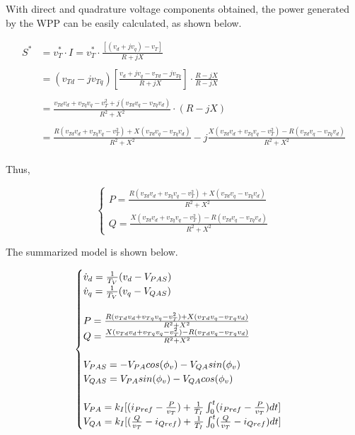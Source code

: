 With direct and quadrature voltage components obtained, the power generated by the WPP can be easily calculated, as shown below.

\begin{align*}
		S^{*} &= v_{T}^{*} \cdot I = v_{T}^{*} \cdot \frac{[(v_{d} + jv_{q}) - v_{T}]}{R + jX} \\
		\\
		&= (v_{Td} - jv_{Tq})\left[\frac{v_{d} + jv_{q} - v_{Td} - jv_{Tq}}{R + jX}\right]\cdot \frac{R - jX}{R - jX} \\
		\\
		&= \frac{v_{Td}v_{d} + v_{Tq}v_{q} - v_{T}^{2} + j(v_{Td}v_{q} - v_{Tq}v_{d})}{R^{2} + X^{2}}\cdot (R - jX) \\
		\\
		&= \frac{R(v_{Td}v_{d} + v_{Tq}v_{q} - v_{T}^{2}) + X(v_{Td}v_{q} - v_{Tq}v_{d})}{R^{2} + X^{2}} - j\frac{X(v_{Td}v_{d} + v_{Tq}v_{q} - v_{T}^{2}) - R(v_{Td}v_{q} - v_{Tq}v_{d})}{R^{2} + X^{2}} \\
\end{align*}

Thus,

\begin{equation}
	\begin{cases}
		P = \frac{R(v_{Td}v_{d} + v_{Tq}v_{q} - v_{T}^{2}) + X(v_{Td}v_{q} - v_{Tq}v_{d})}{R^{2} + X^{2}} \\
		Q = \frac{X(v_{Td}v_{d} + v_{Tq}v_{q} - v_{T}^{2}) - R(v_{Td}v_{q} - v_{Tq}v_{d})}{R^{2} + X^{2}}
	\end{cases}
	\label{eq: Outputs}
\end{equation}

The summarized model is shown below.

\begin{equation}
	\begin{cases}
		\dot{v}_{d} = \frac{1}{T_{V}}(v_{d} - V_{PAS}) \\
		\dot{v}_{q} = \frac{1}{T_{V}}(v_{q} - V_{QAS}) \\
		\\
		P = \frac{R(v_{Td}v_{d} + v_{Tq}v_{q} - v_{T}^{2}) + X(v_{Td}v_{q} - v_{Tq}v_{d})}{R^{2} + X^{2}} \\
		Q = \frac{X(v_{Td}v_{d} + v_{Tq}v_{q} - v_{T}^{2}) - R(v_{Td}v_{q} - v_{Tq}v_{d})}{R^{2} + X^{2}} \\
		\\
		V_{PAS} = -V_{PA}cos(\phi_{v}) - V_{QA}sin(\phi_{v}) \\
		V_{QAS} = V_{PA}sin(\phi_{v}) - V_{QA}cos(\phi_{v}) \\
		\\
		V_{PA} = k_{I}[(i_{Pref} - \frac{P}{v_{T}}) + \frac{1}{T_{I}}\int\displaylimits_{0}^{t} (i_{Pref} - \frac{P}{v_{T}})dt]\\
		V_{QA} = k_{I}[(\frac{Q}{v_{T}} - i_{Qref}) + \frac{1}{T_{I}}\int\displaylimits_{0}^{t} (\frac{Q}{v_{T}} - i_{Qref})dt]
	\end{cases}
	\label{eq: Summary}
\end{equation}

